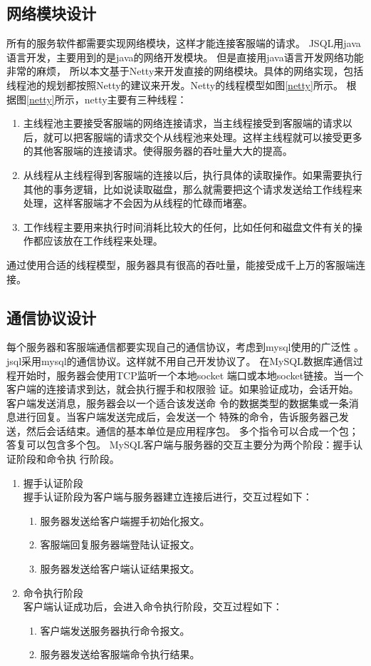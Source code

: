\subsection{网络模块设计}
所有的服务软件都需要实现网络模块，这样才能连接客服端的请求。
JSQL用java语言开发，主要用到的是java的网络开发模块。
但是直接用java语言开发网络功能非常的麻烦，
所以本文基于Netty来开发直接的网络模块。具体的网络实现，包括
线程池的规划都按照Netty的建议来开发。Netty的线程模型如图\ref{netty}所示。
根据图\ref{netty}所示，netty主要有三种线程：
\begin{enumerate}[fullwidth,itemindent=2em,listparindent=2em]
	\item 主线程池主要接受客服端的网络连接请求，当主线程接受到客服端的请求以后，就可以把客服端的请求交个从线程池来处理。这样主线程就可以接受更多的其他客服端的连接请求。使得服务器的吞吐量大大的提高。
	\item 从线程从主线程得到客服端的连接以后，执行具体的读取操作。如果需要执行其他的事务逻辑，比如说读取磁盘，那么就需要把这个请求发送给工作线程来处理，这样客服端才不会因为从线程的忙碌而堵塞。
	\item 工作线程主要用来执行时间消耗比较大的任何，比如任何和磁盘文件有关的操作都应该放在工作线程来处理。
\end{enumerate}
通过使用合适的线程模型，服务器具有很高的吞吐量，能接受成千上万的客服端连接。
\subsection{通信协议设计}
每个服务器和客服端通信都要实现自己的通信协议，考虑到mysql使用的广泛性
。jsql采用mysql的通信协议。这样就不用自己开发协议了。
在MySQL数据库通信过程开始时，服务器会使用TCP监听一个本地socket
端口或本地socket链接。当一个客户端的连接请求到达，就会执行握手和权限验
证。如果验证成功，会话开始。客户端发送消息，服务器会以一个适合该发送命
令的数据类型的数据集或一条消息进行回复。当客户端发送完成后，会发送一个
特殊的命令，告诉服务器己发送，然后会话结束。通信的基本单位是应用程序包。
多个指令可以合成一个包；答复可以包含多个包。
MySQL客户端与服务器的交互主要分为两个阶段：握手认证阶段和命令执
行阶段。

\begin{enumerate}[fullwidth,itemindent=2em,listparindent=2em]
	\item 握手认证阶段\\
	握手认证阶段为客户端与服务器建立连接后进行，交互过程如下：
	\begin{enumerate}
		\item 服务器发送给客户端握手初始化报文。
		\item 客服端回复服务器端登陆认证报文。
		\item 服务器发送给客户端认证结果报文。
	\end{enumerate}
	\item 命令执行阶段\\
	客户端认证成功后，会进入命令执行阶段，交互过程如下：
	\begin{enumerate}
		\item 	客户端发送服务器执行命令报文。
		\item 服务器发送给客服端命令执行结果。
	\end{enumerate}
\end{enumerate}

